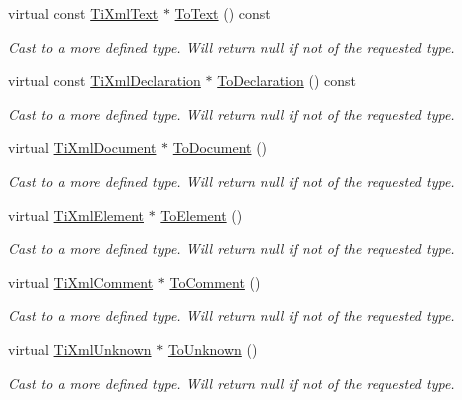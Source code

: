 \begin{DoxyCompactItemize}
virtual const \hyperlink{classTiXmlText}{TiXmlText} $\ast$ \hyperlink{classTiXmlNode_a95a46a52c525992d6b4ee08beb14cd69}{ToText} () const 
\begin{DoxyCompactList}\small\item\em Cast to a more defined type. Will return null if not of the requested type. \item\end{DoxyCompactList}\item 
virtual const \hyperlink{classTiXmlDeclaration}{TiXmlDeclaration} $\ast$ \hyperlink{classTiXmlNode_a9f43e6984fc7d4afd6eb32714c6b7b72}{ToDeclaration} () const 
\begin{DoxyCompactList}\small\item\em Cast to a more defined type. Will return null if not of the requested type. \item\end{DoxyCompactList}\item 
virtual \hyperlink{classTiXmlDocument}{TiXmlDocument} $\ast$ \hyperlink{classTiXmlNode_a6a4c8ac28ee7a745d059db6691e03bae}{ToDocument} ()
\begin{DoxyCompactList}\small\item\em Cast to a more defined type. Will return null if not of the requested type. \item\end{DoxyCompactList}\item 
virtual \hyperlink{classTiXmlElement}{TiXmlElement} $\ast$ \hyperlink{classTiXmlNode_aa65d000223187d22a4dcebd7479e9ebc}{ToElement} ()
\begin{DoxyCompactList}\small\item\em Cast to a more defined type. Will return null if not of the requested type. \item\end{DoxyCompactList}\item 
virtual \hyperlink{classTiXmlComment}{TiXmlComment} $\ast$ \hyperlink{classTiXmlNode_a383e06a0787f7063953934867990f849}{ToComment} ()
\begin{DoxyCompactList}\small\item\em Cast to a more defined type. Will return null if not of the requested type. \item\end{DoxyCompactList}\item 
virtual \hyperlink{classTiXmlUnknown}{TiXmlUnknown} $\ast$ \hyperlink{classTiXmlNode_a06de5af852668c7e4af0d09c205f0b0d}{ToUnknown} ()
\begin{DoxyCompactList}\small\item\em Cast to a more defined type. Will return null if not of the requested type. \item\end{DoxyCompactList}\item 

\end{DoxyCompactItemize}
